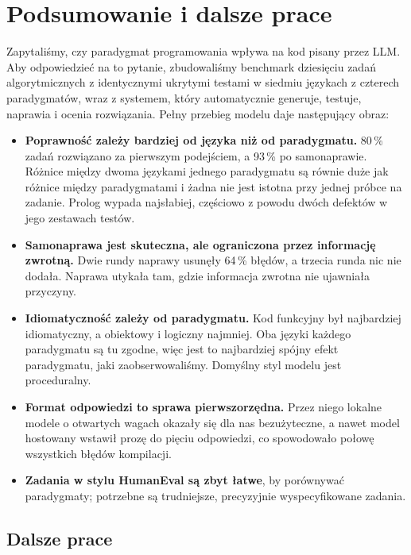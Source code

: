 \chapter{Podsumowanie i dalsze prace}
\label{ch:conclusions}

Zapytaliśmy, czy paradygmat programowania wpływa na kod pisany przez LLM. Aby odpowiedzieć na to
pytanie, zbudowaliśmy benchmark dziesięciu zadań algorytmicznych z identycznymi ukrytymi testami
w siedmiu językach z czterech paradygmatów, wraz z systemem, który automatycznie generuje, testuje,
naprawia i ocenia rozwiązania. Pełny przebieg modelu \haiku{} daje następujący obraz:

\begin{itemize}
  \item \textbf{Poprawność zależy bardziej od języka niż od paradygmatu.} 80\,\% zadań rozwiązano za
    pierwszym podejściem, a 93\,\% po samonaprawie. Różnice między dwoma językami jednego
    paradygmatu są równie duże jak różnice między paradygmatami i żadna nie jest istotna przy
    jednej próbce na zadanie. Prolog wypada najsłabiej, częściowo z powodu dwóch defektów w jego
    zestawach testów.
  \item \textbf{Samonaprawa jest skuteczna, ale ograniczona przez informację zwrotną.} Dwie rundy
    naprawy usunęły 64\,\% błędów, a trzecia runda nic nie dodała. Naprawa utykała tam, gdzie
    informacja zwrotna nie ujawniała przyczyny.
  \item \textbf{Idiomatyczność zależy od paradygmatu.} Kod funkcyjny był najbardziej idiomatyczny,
    a obiektowy i logiczny najmniej. Oba języki każdego paradygmatu są tu zgodne, więc jest to
    najbardziej spójny efekt paradygmatu, jaki zaobserwowaliśmy. Domyślny styl modelu jest
    proceduralny.
  \item \textbf{Format odpowiedzi to sprawa pierwszorzędna.} Przez niego lokalne modele o otwartych
    wagach okazały się dla nas bezużyteczne, a nawet model hostowany wstawił prozę do pięciu
    odpowiedzi, co spowodowało połowę wszystkich błędów kompilacji.
  \item \textbf{Zadania w stylu HumanEval są zbyt łatwe}, by porównywać paradygmaty; potrzebne są
    trudniejsze, precyzyjnie wyspecyfikowane zadania.
\end{itemize}

\section{Dalsze prace}

